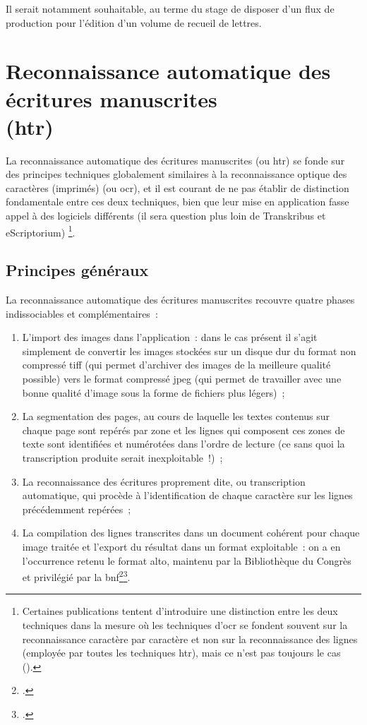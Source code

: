 \documentclass[a4paper,12pt,twoside]{book}
\begin{document}
			Il serait notamment souhaitable, au terme du stage de disposer d'un flux de production pour l'édition d'un volume de recueil de lettres.
				
	\chapter[HTR]{Reconnaissance automatique des écritures manuscrites \\ \large (\gls{htr})}
		
		La reconnaissance automatique des écritures manuscrites (ou \gls{htr}) se fonde sur des principes techniques globalement similaires à la reconnaissance optique des caractères (imprimés) (ou \gls{ocr}), et il est courant de ne pas établir de distinction fondamentale entre ces deux techniques, bien que leur mise en application fasse appel à des logiciels différents (il sera question plus loin de Transkribus et eScriptorium)
		\footnote{Certaines publications tentent d'introduire une distinction entre les deux techniques dans la mesure où les techniques d'\gls{ocr} se fondent souvent sur la reconnaissance caractère par caractère et non sur la reconnaissance des lignes (employée par toutes les techniques \gls{htr}), mais ce n'est pas toujours le cas (\cite{stokesEScriptoriumVREManuscript2021}).}.
		
		\section{Principes généraux}
		
			La reconnaissance automatique des écritures manuscrites recouvre quatre phases indissociables et complémentaires~:
			
			\begin{enumerate}
				\item L'import des images dans l'application~: dans le cas présent il s'agit simplement de convertir les images stockées sur un disque dur du format non compressé \textsf{tiff} (qui permet d'archiver des images de la meilleure qualité possible) vers le format compressé \textsf{jpeg} (qui permet de travailler avec une bonne qualité d'image sous la forme de fichiers plus légers)~;
				\item La \gls{segmentation} des pages, au cours de laquelle les textes contenus sur chaque page sont repérés par zone et les lignes qui composent ces zones de texte sont identifiées et numérotées dans l'ordre de lecture (ce sans quoi la transcription produite serait inexploitable~!)~;
				\item La reconnaissance des écritures proprement dite, ou transcription automatique, qui procède à l'identification de chaque caractère sur les lignes précédemment repérées~;
				\item La compilation des lignes transcrites dans un document cohérent pour chaque image traitée et l'export du résultat dans un format exploitable~: on a en l'occurrence retenu le format \gls{alto}, maintenu par la Bibliothèque du Congrès et privilégié par la \gls{bnf}\footcite{TechniquesFormatsConversion2022}\footcite{stokesEScriptoriumVREManuscript2021}.
			\end{enumerate}
				
\end{document}
